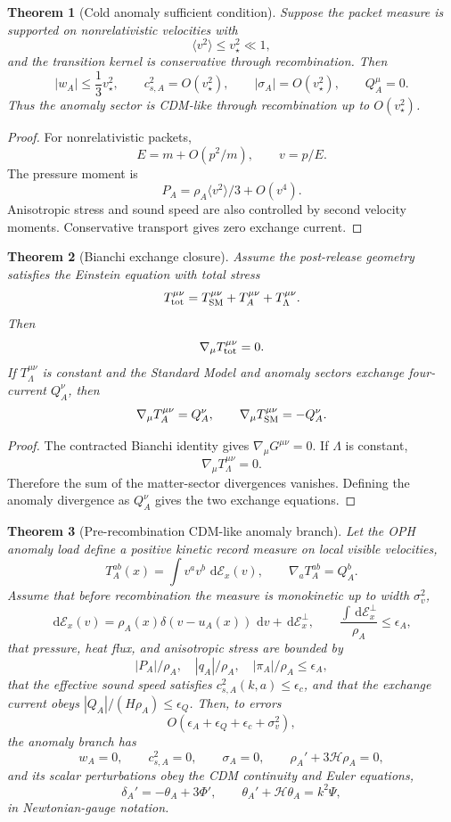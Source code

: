 \documentclass[11pt]{article}
\newtheorem{theorem}{Theorem}[section]
\newcommand{\dd}{\,\mathrm d}
\begin{document}
\begin{theorem}[Cold anomaly sufficient condition]\label{thm:cold-anomaly-sufficient}
Suppose the packet measure is supported on nonrelativistic velocities with
\[
\langle v^2\rangle\le v_\star^2\ll1,
\]
and the transition kernel is conservative through recombination. Then
\[
|w_A|\le \frac13v_\star^2,
\qquad
c_{s,A}^2=O(v_\star^2),
\qquad
|\sigma_A|=O(v_\star^2),
\qquad
Q_A^\mu=0.
\]
Thus the anomaly sector is CDM-like through recombination up to \(O(v_\star^2)\).
\end{theorem}

\begin{proof}
For nonrelativistic packets,
\[
E=m+O(p^2/m),
\qquad
v=p/E.
\]
The pressure moment is
\[
P_A=\rho_A\langle v^2\rangle/3+O(v^4).
\]
Anisotropic stress and sound speed are also controlled by second velocity moments. Conservative
transport gives zero exchange current.
\end{proof}

\begin{theorem}[Bianchi exchange closure]\label{thm:bianchi-exchange}
Assume the post-release geometry satisfies the Einstein equation with total stress
\[
T_{\rm tot}^{\mu\nu}
=
T_{\rm SM}^{\mu\nu}
+
T_A^{\mu\nu}
+
T_\Lambda^{\mu\nu}.
\]
Then
\[
\nabla_\mu T_{\rm tot}^{\mu\nu}=0.
\]
If \(T_\Lambda^{\mu\nu}\) is constant and the Standard Model and anomaly sectors exchange
four-current \(Q_A^\nu\), then
\[
\nabla_\mu T_A^{\mu\nu}=Q_A^\nu,
\qquad
\nabla_\mu T_{\rm SM}^{\mu\nu}=-Q_A^\nu.
\]
\end{theorem}

\begin{proof}
The contracted Bianchi identity gives \(\nabla_\mu G^{\mu\nu}=0\). If \(\Lambda\) is constant,
\[
\nabla_\mu T_\Lambda^{\mu\nu}=0.
\]
Therefore the sum of the matter-sector divergences vanishes. Defining the anomaly divergence as
\(Q_A^\nu\) gives the two exchange equations.
\end{proof}

\begin{theorem}[Pre-recombination CDM-like anomaly branch]\label{thm:anomaly-cdm}
Let the OPH anomaly load define a positive kinetic record measure on local visible velocities,
\[
T_A^{ab}(x)
=
\int v^av^b\,\dd\mathcal E_x(v),
\qquad
\nabla_aT_A^{ab}=Q_A^b.
\]
Assume that before recombination the measure is monokinetic up to width \(\sigma_v^2\),
\[
\dd\mathcal E_x(v)
=
\rho_A(x)\delta(v-u_A(x))\,\dd v+\dd\mathcal E_x^\perp,
\qquad
\frac{\int \dd\mathcal E_x^\perp}{\rho_A}\le\epsilon_A,
\]
that pressure, heat flux, and anisotropic stress are bounded by
\[
|P_A|/\rho_A,\quad |q_A|/\rho_A,\quad |\pi_A|/\rho_A\le\epsilon_A,
\]
that the effective sound speed satisfies \(c_{s,A}^2(k,a)\le\epsilon_c\), and that the exchange
current obeys \(|Q_A|/(H\rho_A)\le\epsilon_Q\). Then, to errors
\[
O(\epsilon_A+\epsilon_Q+\epsilon_c+\sigma_v^2),
\]
the anomaly branch has
\[
w_A=0,\qquad c_{s,A}^2=0,\qquad \sigma_A=0,
\qquad
\rho_A' +3\mathcal H\rho_A=0,
\]
and its scalar perturbations obey the CDM continuity and Euler equations,
\[
\delta_A'=-\theta_A+3\Phi',
\qquad
\theta_A'+\mathcal H\theta_A=k^2\Psi,
\]
in Newtonian-gauge notation.
\end{theorem}
\end{document}
